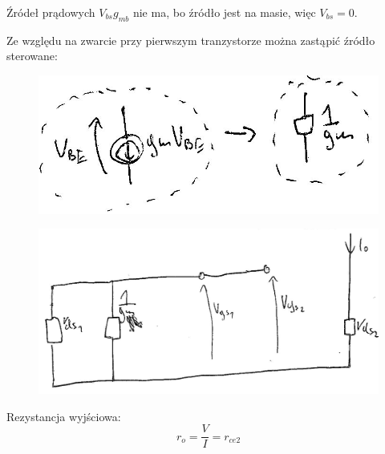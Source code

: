 \documentclass[10pt,a4paper]{article}
\begin{document}
Źródeł prądowych $V_{bs}g_{mb}$ nie ma, bo źródło jest na masie, więc $V_{bs} = 0$.

Ze względu na zwarcie przy pierwszym tranzystorze można zastąpić źródło sterowane:
\begin{figure}[H]
\centering
\includegraphics[scale=0.8]{lustr_wyp2}
\end{figure}
\begin{figure}[H]
\centering
\includegraphics[scale=0.8]{lustr_wyp3}
\end{figure}

Rezystancja wyjściowa: 
\begin{equation}
r_o = \dfrac{V}{I} = r_{ce2}
\end{equation}
\end{document}
